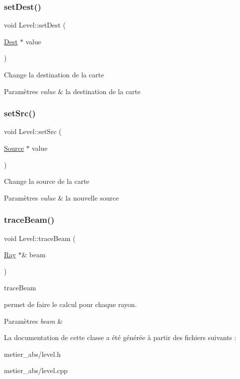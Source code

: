 \subsubsection{\texorpdfstring{setDest()}{setDest()}}
{\footnotesize\ttfamily void Level\+::set\+Dest (\begin{DoxyParamCaption}\item[{\mbox{\hyperlink{class_dest}{Dest}} $\ast$}]{value }\end{DoxyParamCaption})}

Change la destination de la carte 
\begin{DoxyParams}{Paramètres}
{\em value} & la destination de la carte \\
\hline
\end{DoxyParams}
\mbox{\label{class_level_a772e71dd8937989d2f0718f1338e031f}} 
\subsubsection{\texorpdfstring{setSrc()}{setSrc()}}
{\footnotesize\ttfamily void Level\+::set\+Src (\begin{DoxyParamCaption}\item[{\mbox{\hyperlink{class_source}{Source}} $\ast$}]{value }\end{DoxyParamCaption})}

Change la source de la carte 
\begin{DoxyParams}{Paramètres}
{\em value} & la nouvelle source \\
\hline
\end{DoxyParams}
\mbox{\label{class_level_a855bbc14e3a501596c10650fadbca437}} 
\subsubsection{\texorpdfstring{traceBeam()}{traceBeam()}}
{\footnotesize\ttfamily void Level\+::trace\+Beam (\begin{DoxyParamCaption}\item[{\mbox{\hyperlink{class_ray}{Ray}} $\ast$\&}]{beam }\end{DoxyParamCaption})}



trace\+Beam 

permet de faire le calcul pour chaque rayon. 
\begin{DoxyParams}{Paramètres}
{\em beam} & \\
\hline
\end{DoxyParams}


La documentation de cette classe a été générée à partir des fichiers suivants \+:\begin{DoxyCompactItemize}
\item 
metier\+\_\+abs/level.\+h\item 
metier\+\_\+abs/level.\+cpp\end{DoxyCompactItemize}
